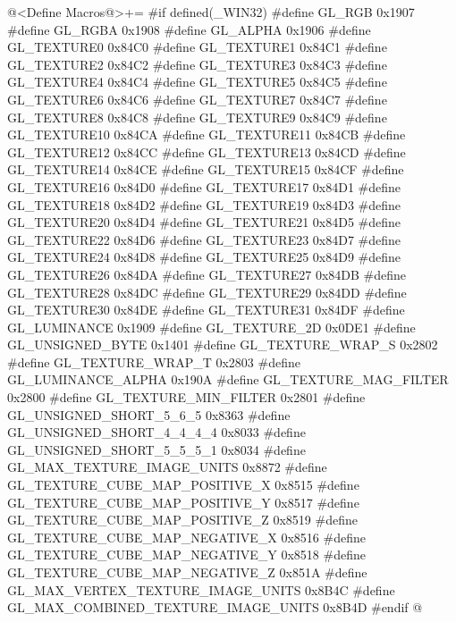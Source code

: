 \iniciocodigo
@<Define Macros@>+=
#if defined(_WIN32)
#define GL_RGB                              0x1907
#define GL_RGBA                             0x1908
#define GL_ALPHA                            0x1906
#define GL_TEXTURE0                         0x84C0
#define GL_TEXTURE1                         0x84C1
#define GL_TEXTURE2                         0x84C2
#define GL_TEXTURE3                         0x84C3
#define GL_TEXTURE4                         0x84C4
#define GL_TEXTURE5                         0x84C5
#define GL_TEXTURE6                         0x84C6
#define GL_TEXTURE7                         0x84C7
#define GL_TEXTURE8                         0x84C8
#define GL_TEXTURE9                         0x84C9
#define GL_TEXTURE10                        0x84CA
#define GL_TEXTURE11                        0x84CB
#define GL_TEXTURE12                        0x84CC
#define GL_TEXTURE13                        0x84CD
#define GL_TEXTURE14                        0x84CE
#define GL_TEXTURE15                        0x84CF
#define GL_TEXTURE16                        0x84D0
#define GL_TEXTURE17                        0x84D1
#define GL_TEXTURE18                        0x84D2
#define GL_TEXTURE19                        0x84D3
#define GL_TEXTURE20                        0x84D4
#define GL_TEXTURE21                        0x84D5
#define GL_TEXTURE22                        0x84D6
#define GL_TEXTURE23                        0x84D7
#define GL_TEXTURE24                        0x84D8
#define GL_TEXTURE25                        0x84D9
#define GL_TEXTURE26                        0x84DA
#define GL_TEXTURE27                        0x84DB
#define GL_TEXTURE28                        0x84DC
#define GL_TEXTURE29                        0x84DD
#define GL_TEXTURE30                        0x84DE
#define GL_TEXTURE31                        0x84DF
#define GL_LUMINANCE                        0x1909
#define GL_TEXTURE_2D                       0x0DE1
#define GL_UNSIGNED_BYTE                    0x1401
#define GL_TEXTURE_WRAP_S                   0x2802
#define GL_TEXTURE_WRAP_T                   0x2803
#define GL_LUMINANCE_ALPHA                  0x190A
#define GL_TEXTURE_MAG_FILTER               0x2800
#define GL_TEXTURE_MIN_FILTER               0x2801
#define GL_UNSIGNED_SHORT_5_6_5             0x8363
#define GL_UNSIGNED_SHORT_4_4_4_4           0x8033
#define GL_UNSIGNED_SHORT_5_5_5_1           0x8034
#define GL_MAX_TEXTURE_IMAGE_UNITS          0x8872
#define GL_TEXTURE_CUBE_MAP_POSITIVE_X      0x8515
#define GL_TEXTURE_CUBE_MAP_POSITIVE_Y      0x8517
#define GL_TEXTURE_CUBE_MAP_POSITIVE_Z      0x8519
#define GL_TEXTURE_CUBE_MAP_NEGATIVE_X      0x8516
#define GL_TEXTURE_CUBE_MAP_NEGATIVE_Y      0x8518
#define GL_TEXTURE_CUBE_MAP_NEGATIVE_Z      0x851A
#define GL_MAX_VERTEX_TEXTURE_IMAGE_UNITS   0x8B4C
#define GL_MAX_COMBINED_TEXTURE_IMAGE_UNITS 0x8B4D
#endif
@
\fimcodigo

